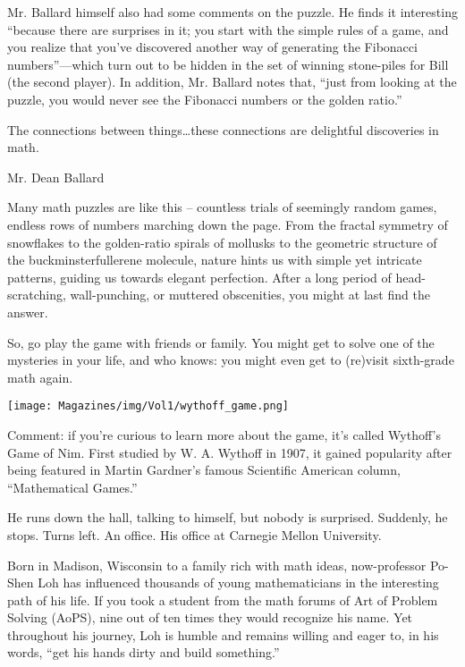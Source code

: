\documentclass{article}
\begin{document}
\begin{multicols}{3}
Mr. Ballard himself also had some comments on the puzzle. He finds it interesting “because there are surprises in it; you start with the simple rules of a game, and you realize that you’ve discovered another way of generating the Fibonacci numbers”—which turn out to be hidden in the set of winning stone-piles for Bill (the second player). In addition, Mr. Ballard notes that, “just from looking at the puzzle, you would never see the Fibonacci numbers or the golden ratio.”

\epigraph{The connections between things…these connections are delightful discoveries in math.}{Mr. Dean Ballard}

Many math puzzles are like this – countless trials of seemingly random games, endless rows of numbers marching down the page. From the fractal symmetry of snowflakes to the golden-ratio spirals of mollusks to the geometric structure of the buckminsterfullerene molecule, nature hints us with simple yet intricate patterns, guiding us towards elegant perfection. After a long period of head-scratching, wall-punching, or muttered obscenities, you might at last find the answer.


So, go play the game with friends or family. You might get to solve one of the mysteries in your life, and who knows: you might even get to (re)visit sixth-grade math again.

\begin{center}
    \texttt{[image: Magazines/img/Vol1/wythoff\_game.png]}
\end{center}

Comment: if you’re curious to learn more about the game, it’s called Wythoff’s Game of Nim. First studied by W. A. Wythoff in 1907, it gained popularity after being featured in Martin Gardner’s famous Scientific American column, “Mathematical Games.”
\closearticle


He runs down the hall, talking to himself, but nobody is surprised. Suddenly, he stops. Turns left. An office. His office at Carnegie Mellon University.

Born in Madison, Wisconsin to a family rich with math ideas, now-professor Po-Shen Loh has influenced thousands of young mathematicians in the interesting path of his life. If you took a student from the math forums of Art of Problem Solving (AoPS), nine out of ten times they would recognize his name.  Yet throughout his journey, Loh is humble and remains willing and eager to, in his words, “get his hands dirty and build something.”


\end{multicols}
\end{document}

